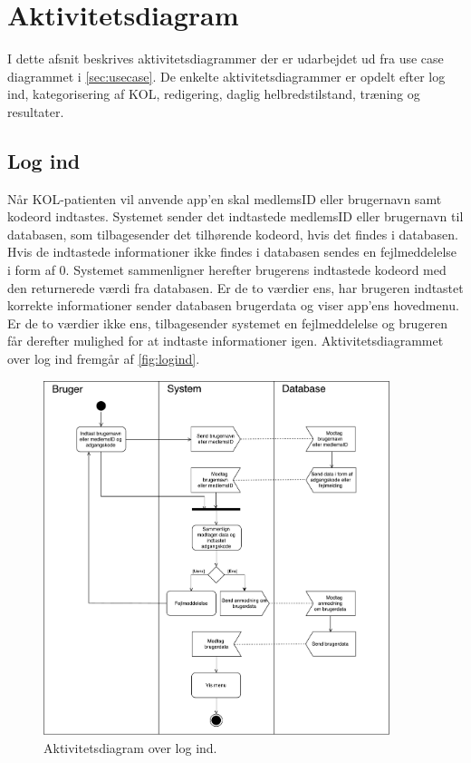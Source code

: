 \section{Aktivitetsdiagram}
I dette afsnit beskrives aktivitetsdiagrammer der er udarbejdet ud fra use case diagrammet i \autoref{sec:usecase}. De enkelte aktivitetsdiagrammer er opdelt efter log ind, kategorisering af KOL, redigering, daglig helbredstilstand, træning og resultater.    

\subsection{Log ind}
Når KOL-patienten vil anvende app'en skal medlemsID eller brugernavn samt kodeord indtastes. Systemet sender det indtastede medlemsID eller brugernavn til databasen, som tilbagesender det tilhørende kodeord, hvis det findes i databasen. Hvis de indtastede informationer ikke findes i databasen sendes en fejlmeddelelse i form af 0. Systemet sammenligner herefter brugerens indtastede kodeord med den returnerede værdi fra databasen. Er de to værdier ens, har brugeren indtastet korrekte informationer sender databasen brugerdata og viser app'ens hovedmenu. Er de to værdier ikke ens, tilbagesender systemet en fejlmeddelelse og brugeren får derefter mulighed for at indtaste informationer igen. Aktivitetsdiagrammet over log ind fremgår af \autoref{fig:logind}.

\begin{figure} [H]
\centering
\includegraphics[width=0.9\textwidth]{figures/aktivitetsdiagram/Logind}
\caption{Aktivitetsdiagram over log ind.}
\label{fig:logind}
\end{figure}



